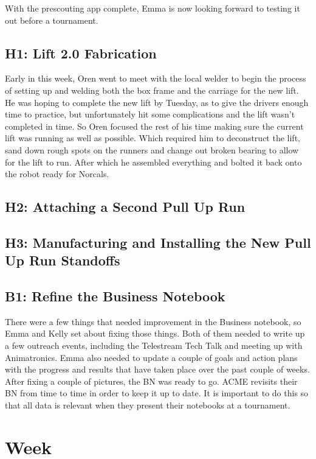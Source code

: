 \documentclass{article}
\begin{document}
With the prescouting app complete, Emma is now looking forward to testing it out before a tournament. 
\subsection{H1: Lift 2.0 Fabrication}

Early in this week, Oren went to meet with the local welder to begin the process of setting up and welding both the box frame and the carriage for the new lift. He was hoping to complete the new lift by Tuesday, as to give the drivers enough time to practice, but unfortunately hit some complications and the lift wasn't completed in time. So Oren focused the rest of his time making sure the current lift was running as well as possible. Which required him to deconstruct the lift, sand down rough spots on the runners and change out broken bearing to allow for the lift to run. After which he assembled everything and bolted it back onto the robot ready for Norcals. 

\subsection{H2: Attaching a Second Pull Up Run}

\subsection{H3: Manufacturing and Installing the New Pull Up Run Standoffs}

\subsection{B1: Refine the Business Notebook}

There were a few things that needed improvement in the Business notebook, so Emma and Kelly set about fixing those things. Both of them needed to write up a few outreach events, including the Telestream Tech Talk and meeting up with Animatronics. Emma also needed to update a couple of goals and action plans with the progress and results that have taken place over the past couple of weeks. After fixing a couple of pictures, the BN was ready to go. ACME revisits their BN from time to time in order to keep it up to date. It is important to do this so that all data is relevant when they present their notebooks at a tournament. 

\clearpage \newpage \section{Week \thesection} 
\end{document}
